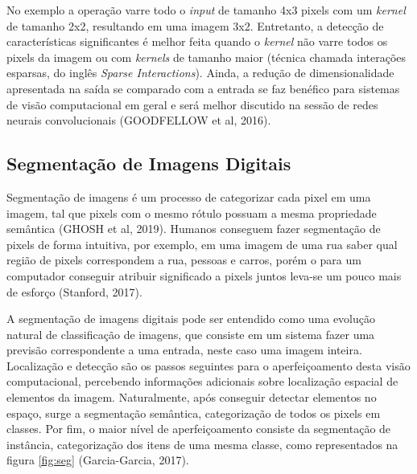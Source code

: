 \documentclass[12pt]{report}
\begin{document}
No exemplo a operação varre todo o \textit{input} de tamanho 4x3 pixels com um \textit{kernel} de tamanho 2x2, resultando em uma imagem 3x2. Entretanto, a detecção de características significantes é melhor feita quando o \textit{kernel} não varre todos os pixels da imagem ou com \textit{kernels} de tamanho maior (técnica chamada interações esparsas, do inglês \textit{Sparse Interactions}). Ainda, a redução de dimensionalidade apresentada na saída se comparado com a entrada se faz benéfico para sistemas de visão computacional em geral e será melhor discutido na sessão de redes neurais convolucionais (GOODFELLOW et al, 2016).

\subsection{Segmentação de Imagens Digitais}

Segmentação de imagens é um processo de categorizar cada pixel em uma imagem, tal que pixels com o mesmo rótulo possuam a mesma propriedade semântica (GHOSH et al, 2019). Humanos conseguem fazer segmentação de pixels de forma intuitiva, por exemplo, em uma imagem de uma rua saber qual região de pixels correspondem a rua, pessoas e carros, porém o para um computador conseguir atribuir significado a pixels juntos leva-se um pouco mais de esforço (Stanford, 2017).  

A segmentação de imagens digitais pode ser entendido como uma evolução natural de classificação de imagens, que consiste em um sistema fazer uma previsão correspondente a uma entrada, neste caso uma imagem inteira. Localização e detecção são os passos seguintes para o aperfeiçoamento desta visão computacional, percebendo informações adicionais sobre localização espacial de elementos da imagem. Naturalmente, após conseguir detectar elementos no espaço, surge a segmentação semântica, categorização de todos os pixels em classes. Por fim, o maior nível de aperfeiçoamento consiste da segmentação de instância, categorização dos itens de uma mesma classe, como representados na figura \ref{fig:seg} (Garcia-Garcia, 2017).
\end{document}

